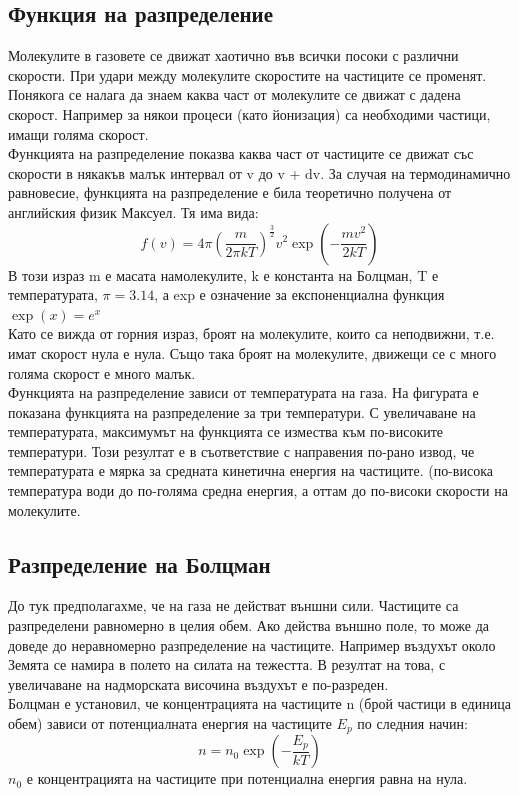\documentclass[fleqn, 12pt]{article}
\theoremstyle{definition}
\begin{document}
\subsection{Функция на разпределение}
Молекулите в газовете се движат хаотично във
всички посоки с различни скорости. При удари между
молекулите скоростите на частиците се променят.
Понякога се налага да знаем каква част от молекулите
се движат с дадена скорост. Например за някои
процеси (като йонизация) са необходими частици,
имащи голяма скорост. \\
Функцията на разпределение показва каква
част от частиците се движат със скорости в някакъв
малък интервал от
v до v + dv. За случая на
термодинамично равновесие, функцията на
разпределение е била теоретично получена от
английския физик Максуел. Тя има вида: \\
$$f(v) = 4\pi(\frac{m}{2\pi kT})^{\frac{3}{2}} v^2 \exp \left({- \frac{mv^2}{2kT}}\right)$$
В този израз
m е масата намолекулите, k е константа на Болцман, 
T е температурата, $\pi = 3.14$, а exp е означение за експоненциална функция $\exp{(x)} = e^x$ \\
Като се вижда от горния израз, броят на молекулите, които са неподвижни, т.е.
имат скорост нула е нула. Също така броят на молекулите, движещи се с много голяма
скорост е много малък.\\
Функцията на разпределение зависи от температурата на газа. На фигурата е 
показана функцията на разпределение за три температури. С увеличаване на
температурата, максимумът на функцията се измества към по-високите температури.
Този резултат е в съответствие с направения по-рано извод, че температурата е мярка за
средната кинетична енергия на частиците. (по-висока температура води до по-голяма
средна енергия, а оттам до по-високи скорости на молекулите.

\subsection{Разпределение на Болцман}
До тук предполагахме, че на газа не действат външни сили. Частиците са
разпределени равномерно в целия обем. Ако действа външно поле, то може да доведе
до неравномерно разпределение на частиците. Например въздухът около Земята се
намира в полето на силата на тежестта. В резултат на това, с увеличаване на
надморската височина въздухът е по-разреден. \\
Болцман е установил, че концентрацията на частиците
n (брой частици в единица обем) зависи от потенциалната енергия на частиците
$E_p$ по следния начин:
$$n = n_0 \exp{\left( - \frac{E_p}{kT}\right)}$$
$n_0$ е концентрацията на частиците при потенциална енергия равна на нула.
\end{document}
